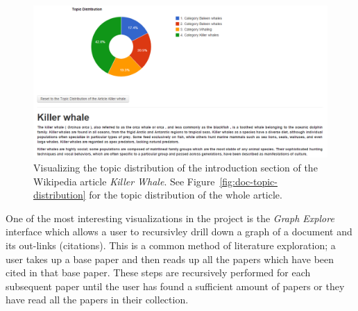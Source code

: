 \begin{figure}[htb]\centering 
\includegraphics[width=1\textwidth]{images/para_topic_distribution.png}
\caption{Visualizing the topic distribution of the introduction 
section of the Wikipedia article \textit{Killer Whale}. See Figure~\ref{fig:doc-topic-distribution} for the topic distribution of 
the whole article.}
\label{fig:doc-para-viz}
\end{figure}


One of the most interesting visualizations in the project is the 
\textsl{Graph Explore} interface which allows a user to recursivley 
drill down a graph of a document and its out-links (citations).
This is a common method of literature exploration; a user takes up a base paper and then reads up all the papers which have been cited in that base paper.
These steps are recursively performed for each subsequent paper until the user has found a sufficient amount of papers or they have read all the papers in their collection.

